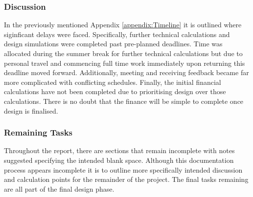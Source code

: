 \subsubsection{Discussion}

In the previously mentioned Appendix \ref{appendix:Timeline} it is outlined where siginficant delays were faced. Specifically, further technical calculations and design simulations were completed past pre-planned deadlines. Time was allocated during the summer break for further technical calculations but due to personal travel and commencing full time work immediately upon returning this deadline moved forward. Additionally, meeting and receiving feedback became far more complicated with conflicting schedules. Finally, the initial financial calculations have not been completed due to prioritising design over those calculations. There is no doubt that the finance will be simple to complete once design is finalised. 

\subsubsection{Remaining Tasks} \label{section:remaining-tasks}


Throughout the report, there are sections that remain incomplete with notes suggested specifying the intended blank space. Although this documentation process appears incomplete it is to outline more specifically intended discussion and calculation points for the remainder of the project. The final tasks remaining are all part of the final design phase.

